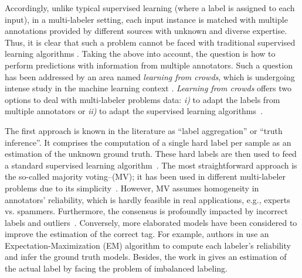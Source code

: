 \documentclass[journal]{IEEEtran}
\begin{document}
Accordingly, unlike typical supervised learning (where a label is
assigned to each input), in a multi-labeler setting, each input
instance is matched with multiple annotations provided by different
sources with unknown and diverse expertise. Thus, it is clear that
such a problem cannot be faced with traditional supervised learning
algorithms \cite{tao2018domain,wang2016bi}. Taking the above into
account, the question is how to perform predictions with information
from multiple annotators. Such a question has been addressed by an
area named \emph{learning from crowds}, which is undergoing intense
study in the machine learning context
\cite{groot2011learning}. \emph{Learning from crowds} offers two
options to deal with multi-labeler problems data: \textit{i)} to adapt
the labels from multiple annotators or \textit{ii)} to adapt the
supervised learning algorithms~\cite{rizos2020average}.

The first approach is known in the literature as ``label aggregation''
or ``truth inference''. It comprises the computation of a single hard
label per sample as an estimation of the unknown ground truth. These
hard labels are then used to feed a standard supervised learning
algorithm~\cite{morales2019scalable}. The most straightforward
approach is the so-called majority voting--(MV); it has been used in
different multi-labeler problems due to its
simplicity~\cite{zhang2014imbalanced}. However, MV assumes homogeneity
in annotators' reliability, which is hardly feasible in real
applications, e.g., experts vs. spammers. Furthermore, the consensus
is profoundly impacted by incorrect labels and
outliers~\cite{kara2015modeling}. Conversely, more elaborated models
have been considered to improve the estimation of the correct tag. For
example, authors in \cite{dawid1979maximum} use an
Expectation-Maximization (EM) algorithm to compute each labeler's
reliability and infer the ground truth models. Besides, the work in
\cite{zhang2014imbalanced} gives an estimation of the actual label by
facing the problem of imbalanced labeling.
\end{document}
